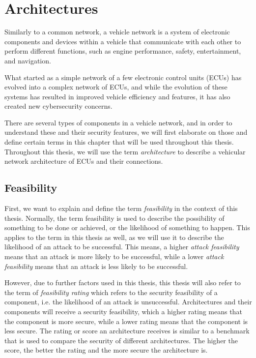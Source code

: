 \chapter{Architectures}
\label{chp:arch}

Similarly to a common network, a vehicle network is a system of electronic components and devices within a vehicle 
that communicate with each other to perform different functions, such as engine performance, safety, entertainment, and navigation. 

What started as a simple network of a few electronic control units (ECUs) has evolved into a complex network of ECUs,
and while the evolution of these systems has resulted in improved vehicle efficiency and features, 
it has also created new cybersecurity concerns.

There are several types of components in a vehicle network, and in order to understand these and their security features,
we will first elaborate on those and define certain terms in this chapter that will be used throughout this thesis.
Throughout this thesis, we will use the term \textit{architecture} to describe a vehicular network architecture of ECUs and their connections.

\section{Feasibility}
\label{def:feasibility}

First, we want to explain and define the term \textit{feasibility} in the context of this thesis.
Normally, the term feasibility is used to describe the possibility of something to be done or achieved, or the likelihood of something to happen.
This applies to the term in this thesis as well, as we will use it to describe the likelihood of an attack to be successful.
This means, a higher \textit{attack feasibility} means that an attack is more likely to be successful, while a lower \textit{attack feasibility} means that an attack is less likely to be successful.

However, due to further factors used in this thesis, this thesis will also refer to the term of \textit{feasibility rating}
which refers to the security feasibility of a component, i.e. the likelihood of an attack is unsuccessful.
Architectures and their components will receive a security feasibility, which a higher rating means that the component is more secure, while a lower rating means that the component is less secure.
The rating or score an architecture receives is similar to a benchmark that is used to compare the security of different architectures.
The higher the score, the better the rating and the more secure the architecture is.

